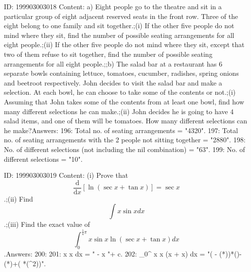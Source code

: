 \documentclass{article}
\begin{document}
ID: 199903003018
Content:
a) Eight people go to the theatre and sit in a particular group of eight adjacent reserved seats in the front row. Three of the eight belong to one family and sit together.;(i) If the other five people do not mind where they sit, find the number of possible seating arrangements for all eight people.;(ii) If the other five people do not mind where they sit, except that two of them refuse to sit together, find the number of possible seating arrangements for all eight people.;;b) The salad bar at a restaurant has 6 separate bowls containing lettuce, tomatoes, cucumber, radishes, spring onions and beetroot respectively. John decides to visit the salad bar and make a selection. At each bowl, he can choose to take some of the contents or not.;(i) Assuming that John takes some of the contents from at least one bowl, find how many different selections he can make.;(ii) John decides he is going to have 4 salad items, and one of them will be tomatoes. How many different selections can he make?Answers:
196: Total no. of seating arrangements = "4320".
197: Total no. of seating arrangements with the 2 people not sitting together = "2880".
198: No. of different selections (not including the nil combination) = "63".
199: No. of different selections = "10".

ID: 199903003019
Content:
(i) Prove that \[\frac{\mathrm{d} }{\mathrm{d} x} [\ln (\sec x + \tan x)] = \sec x\].;(ii) Find \[\int x\sin x dx\].;(iii) Find the exact value of \[\int_{0}^{\frac {1}{4} \pi} x\sin x\ln(\sec x + \tan x) dx\].Answers:
200: 
201: \int x \sin x dx = " - x "+ c.
202: \int_0^{\pi} x \sin x \ln (\sec x + \tan x) dx = "( - (*\pi))*()-(*)+( *(\pi^2))".
\end{document}
